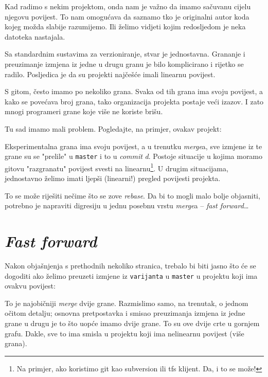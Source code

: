 Kad radimo s nekim projektom, onda nam je važno da imamo sačuvanu cijelu njegovu povijest.
To nam omogućava da saznamo tko je originalni autor koda kojeg možda slabije razumijemo.
Ili želimo vidjeti kojim redosljedom je neka datoteka nastajala.

Sa standardnim sustavima za verzioniranje, stvar je jednostavna. 
Grananje i preuzimanje izmjena iz jedne u drugu granu je bilo komplicirano i rijetko se radilo. 
Posljedica je da su projekti najčešće imali linearnu povijest.



S gitom, često imamo po nekoliko grana.
Svaka od tih grana ima svoju povijest, a kako se povećava broj grana, tako organizacija projekta postaje veći izazov.
I zato mnogi programeri grane koje više ne koriste brišu.

Tu sad imamo mali problem.
Pogledajte, na primjer, ovakav projekt:



Eksperimentalna grana ima svoju povijest, a u trenutku \emph{merge}a, sve izmjene iz te grane su se "prelile" u \verb+master+ i to u \emph{commit} \emph d.
Postoje situacije u kojima moramo gitovu "razgranatu" povijest svesti na linearnu\footnote{Na primjer, ako koristimo git kao subversion ili tfs klijent. Da, i to se može!}.
U drugim situacijama, jednostavno želimo imati ljepši (linearni!) pregled povijesti projekta.

To se može riješiti nečime što se zove \emph{rebase}.
Da bi to mogli malo bolje objasniti, potrebno je napraviti digresiju u jednu posebnu vrstu \emph{merge}a -- \emph{fast forward}\dots

\section*{\emph{Fast forward}}

Nakon objašnjenja s prethodnih nekoliko stranica, trebalo bi biti jasno što će se dogoditi ako želimo preuzeti izmjene iz \verb+varijanta+ u \verb+master+ u projektu koji ima ovakvu povijest:



To je najobičniji \emph{merge} dvije grane.
Razmislimo samo, na trenutak, o jednom očitom detalju;
osnovna pretpostavka i smisao preuzimanja izmjena iz jedne grane u drugu je to što uopće imamo dvije grane.
To su ove dvije crte u gornjem grafu.
Dakle, sve to ima smisla u projektu koji ima nelinearnu povijest (više grana).

